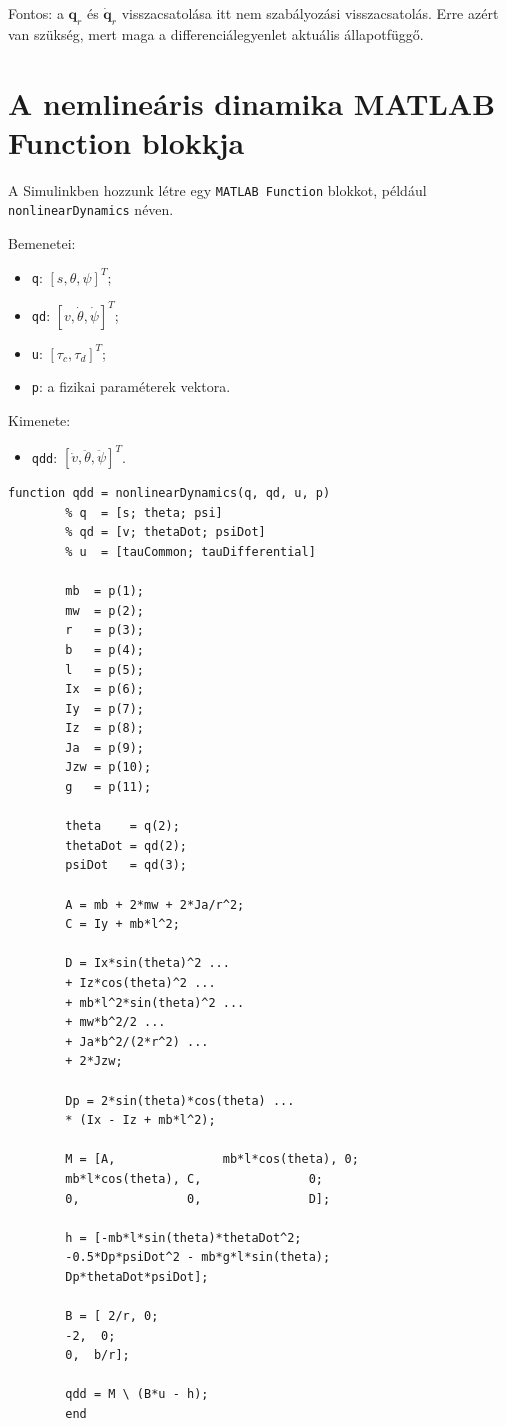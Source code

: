 \documentclass[12pt,a4paper]{article}
\begin{document}
	Fontos: a $\bm q_r$ és $\dot{\bm q}_r$ visszacsatolása itt nem szabályozási visszacsatolás. Erre azért van szükség, mert maga a differenciálegyenlet aktuális állapotfüggő.
	
	\section{A nemlineáris dinamika MATLAB Function blokkja}
	
	A Simulinkben hozzunk létre egy \texttt{MATLAB Function} blokkot, például \texttt{nonlinearDynamics} néven.
	
	Bemenetei:
	\begin{itemize}[leftmargin=2em]
		\item \texttt{q}: $[s,\theta,\psi]^T$;
		\item \texttt{qd}: $[v,\dot\theta,\dot\psi]^T$;
		\item \texttt{u}: $[\tau_c,\tau_d]^T$;
		\item \texttt{p}: a fizikai paraméterek vektora.
	\end{itemize}
	
	Kimenete:
	\begin{itemize}[leftmargin=2em]
		\item \texttt{qdd}: $[\dot v,\ddot\theta,\ddot\psi]^T$.
	\end{itemize}
	
	\begin{lstlisting}[style=matlab,caption={A nemlineáris mechanikai dinamika MATLAB Function blokkja}]
		function qdd = nonlinearDynamics(q, qd, u, p)
		% q  = [s; theta; psi]
		% qd = [v; thetaDot; psiDot]
		% u  = [tauCommon; tauDifferential]
		
		mb  = p(1);
		mw  = p(2);
		r   = p(3);
		b   = p(4);
		l   = p(5);
		Ix  = p(6);
		Iy  = p(7);
		Iz  = p(8);
		Ja  = p(9);
		Jzw = p(10);
		g   = p(11);
		
		theta    = q(2);
		thetaDot = qd(2);
		psiDot   = qd(3);
		
		A = mb + 2*mw + 2*Ja/r^2;
		C = Iy + mb*l^2;
		
		D = Ix*sin(theta)^2 ...
		+ Iz*cos(theta)^2 ...
		+ mb*l^2*sin(theta)^2 ...
		+ mw*b^2/2 ...
		+ Ja*b^2/(2*r^2) ...
		+ 2*Jzw;
		
		Dp = 2*sin(theta)*cos(theta) ...
		* (Ix - Iz + mb*l^2);
		
		M = [A,               mb*l*cos(theta), 0;
		mb*l*cos(theta), C,               0;
		0,               0,               D];
		
		h = [-mb*l*sin(theta)*thetaDot^2;
		-0.5*Dp*psiDot^2 - mb*g*l*sin(theta);
		Dp*thetaDot*psiDot];
		
		B = [ 2/r, 0;
		-2,  0;
		0,  b/r];
		
		qdd = M \ (B*u - h);
		end
	\end{lstlisting}
	
\end{document}
